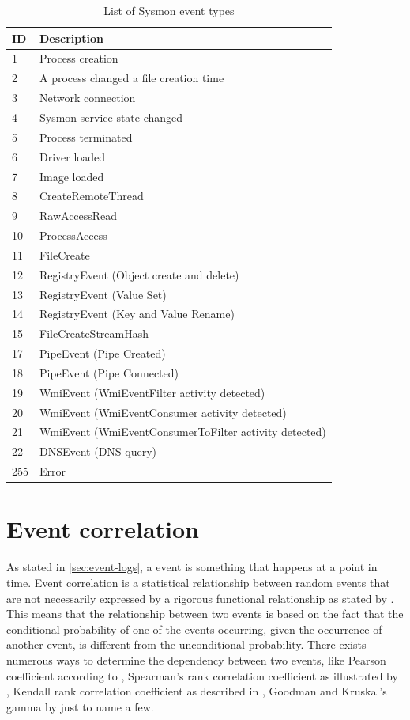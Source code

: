 \begin{table}[htbp]
\begin{tabular}{l|l}
ID & Description \\ \hline
1 & Process creation \\
2 & A process changed a file creation time \\
3 & Network connection \\
4 & Sysmon service state changed \\
5 & Process terminated \\
6 & Driver loaded \\
7 & Image loaded \\
8 & CreateRemoteThread \\
9 & RawAccessRead \\
10 & ProcessAccess \\
11 & FileCreate \\
12 & RegistryEvent (Object create and delete) \\
13 & RegistryEvent (Value Set) \\
14 & RegistryEvent (Key and Value Rename) \\
15 & FileCreateStreamHash \\
17 & PipeEvent (Pipe Created) \\
18 & PipeEvent (Pipe Connected) \\
19 & WmiEvent (WmiEventFilter activity detected) \\
20 & WmiEvent (WmiEventConsumer activity detected) \\
21 & WmiEvent (WmiEventConsumerToFilter activity detected) \\
22 & DNSEvent (DNS query) \\
255 & Error
\end{tabular}
\caption{List of Sysmon event types}
\label{tab:sysmoneventtypes}
\end{table}



\section{Event correlation}

As stated in \cref{sec:event-logs}, a event is something that happens at a point in time. Event correlation is a statistical relationship between random events that are not necessarily expressed by a rigorous functional relationship as stated by \textcite{Prokhorov_correlation_in_statistics}. This means that the relationship between two events is based on the fact that the conditional probability of one of the events occurring, given the occurrence of another event, is different from the unconditional probability. There exists numerous ways to determine the dependency between two events, like Pearson coefficient according to \textcite{PearsonC62:online}, Spearman's rank correlation coefficient as illustrated by \textcite{Spearman38:online}, Kendall rank correlation coefficient as described in \textcite{Kendallc32:online}, Goodman and Kruskal's gamma by \textcite{Goodman_1954} just to name a few.

